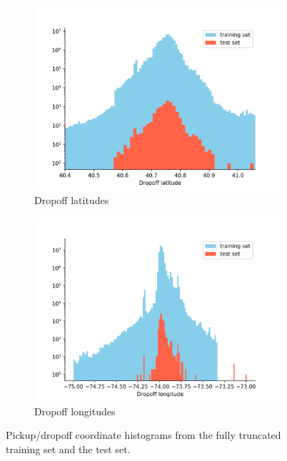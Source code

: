 \documentclass[12pt,letterpaper,final]{article}
\numberwithin{equation}{section}
\begin{document}
\begin{figure}[H]
\begin{subfigure}{0.51\textwidth}
  \includegraphics[width=.85\linewidth,keepaspectratio]{plots/dropped_outliers/dropoff_latitude_training.png}
\caption{Dropoff latitudes}
\end{subfigure}%
\hspace*{-2cm}
\begin{subfigure}{.51\textwidth}
  \centering
  \includegraphics[width=.85\linewidth,keepaspectratio]{plots/dropped_outliers/dropoff_longitude_training.png}
  \caption{Dropoff longitudes}
\end{subfigure}
\caption{Pickup/dropoff coordinate histograms from the fully truncated training set and the test set.}
\label{coordinates2}
\end{figure}

\vspace*{-20pt}
\end{document}
